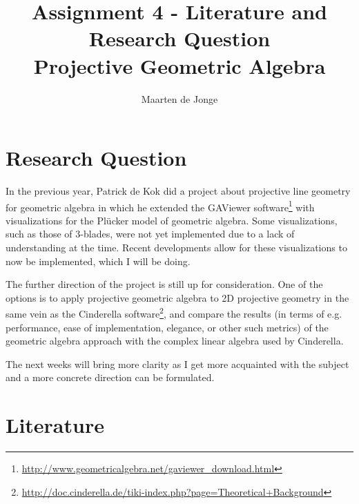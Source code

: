 \documentclass[a4paper, 10pt]{article}
\author{Maarten de Jonge}
\title{Assignment 4 - Literature and Research Question \\
\large{Projective Geometric Algebra}}
\begin{document}
\maketitle

\section*{Research Question}
In the previous year, Patrick de Kok did a project about projective line
geometry for geometric algebra\cite{dekok2012} in which he extended the GAViewer
software\footnote{\url{http://www.geometricalgebra.net/gaviewer\_download.html}}
with visualizations for the Pl\"{u}cker model of geometric algebra. Some
visualizations, such as those of 3-blades, were not yet implemented due to a
lack of understanding at the time. Recent developments allow for these
visualizations to now be implemented, which I will be doing.

The further direction of the project is still up for consideration. One of the
options is to apply projective geometric algebra to 2D projective geometry in
the same vein as the Cinderella
software\footnote{\url{http://doc.cinderella.de/tiki-index.php?page=Theoretical+Background}},
and compare the results (in terms of e.g. performance, ease of implementation,
elegance, or other such metrics) of the geometric algebra approach with the
complex linear algebra used by Cinderella.

The next weeks will bring more clarity as I get more acquainted with the subject
and a more concrete direction can be formulated.

\section*{Literature}
\end{document}
